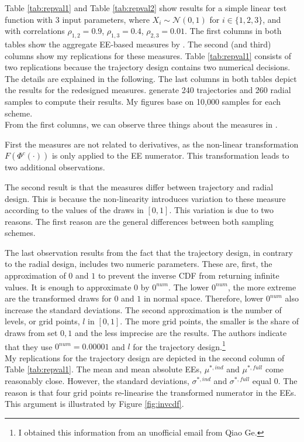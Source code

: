 \noindent
Table \ref{tab:repval1} and Table \ref{tab:repval2} show results for a simple linear test function with 3 input parameters, where $X_i \sim \mathcal{N}(0, 1)$ for $i \in \{1,2,3\}$, and with correlations $\rho_{1,2}=0.9$, $\rho_{1,3}=0.4$, $\rho_{2,3}=0.01$. The first columns in both tables show the aggregate EE-based measures by \cite{ge2017extending}. The second (and third) columns show my replications for these measures. Table \ref{tab:repval1} consists of two replications because the trajectory design contains two numerical decisions. The details are explained in the following. The last columns in both tables depict the results for the redesigned measures. \citeauthor{ge2017extending} generate 240 trajectories and 260 radial samples to compute their results. My figures base on 10,000 samples for each scheme.\\

\noindent
From the first columns, we can observe three things about the measures in \cite{ge2017extending}.

First the measures are not related to derivatives, as the non-linear transformation $F(\Phi^c(\cdot))$ is only applied to the EE numerator. This transformation leads to two additional observations.


The second result is that the measures differ between trajectory and radial design. This is because the non-linearity introduces variation to these measure according to the values of the draws in $[0,1]$. This variation is due to two reasons. The first reason are the general differences between both sampling schemes.


The last observation results from the fact that the trajectory design, in contrary to the radial design, includes two numeric parameters. These are, first, the approximation of $0$ and $1$ to prevent the inverse CDF from returning infinite values. It is enough to approximate $0$ by $0^{num}$. The lower $0^{num}$, the more extreme are the transformed draws for $0$ and $1$ in normal space. Therefore, lower $0^{num}$ also increase the standard deviations. The second approximation is the number of levels, or grid points, $l$ in $[0,1]$. The more grid points, the smaller is the share of draws from set ${0,1}$ and the less imprecise are the results.
The authors indicate that they use $0^{num}=0.00001$ and $l$ for the trajectory design.\footnote{I obtained this information from an unofficial email from Qiao Ge.}\\

\noindent
My replications for the trajectory design are depicted in the second column of Table \ref{tab:repval1}. The mean and mean absolute EEs, $\mu^{*,ind}$ and $\mu^{*,full}$ come reasonably close. However, the standard deviations, $\sigma^{*,ind}$ and $\sigma^{*,full}$ equal 0. The reason is that four grid points re-linearise the transformed numerator in the EEs. This argument is illustrated by Figure \ref{fig:invcdf}.



